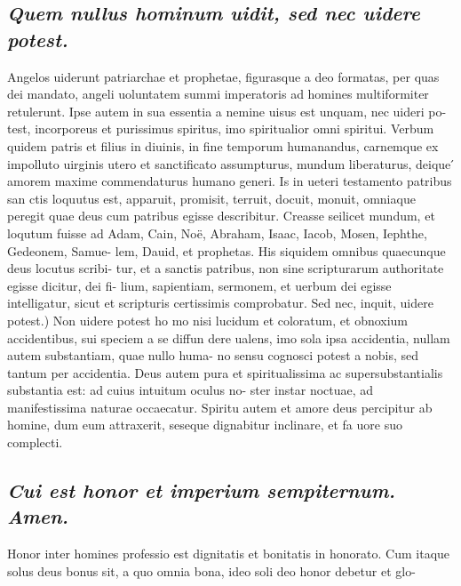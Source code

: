 \documentclass{article}
\begin{document}
\begin{pages}
\subsection*{\textit{Quem nullus hominum uidit, sed nec uidere potest. }}\pstart Angelos uiderunt patriarchae et prophetae, figurasque a deo formatas, per quas dei mandato, angeli uoluntatem summi imperatoris ad homines multiformiter retulerunt. Ipse autem in sua essentia a nemine uisus est unquam, nec uideri po- test, incorporeus et purissimus spiritus, imo spiritualior omni spiritui. Verbum quidem patris et filius in diuinis, in fine temporum humanandus, carnemque ex impolluto uirginis utero et sanctificato assumpturus, mundum liberaturus, deique ́ amorem maxime commendaturus humano generi. Is in ueteri testamento patribus san ctis loquutus est, apparuit, promisit, terruit, docuit, monuit, omniaque peregit quae deus cum patribus egisse describitur. Creasse seilicet mundum, et loqutum fuisse ad Adam, Cain, Noë, Abraham, Isaac, Iacob, Mosen, Iephthe, Gedeonem, Samue- lem, Dauid, et prophetas. His siquidem omnibus quaecunque deus locutus scribi- tur, et a sanctis patribus, non sine scripturarum authoritate egisse dicitur, dei fi- lium, sapientiam, sermonem, et uerbum dei egisse intelligatur, sicut et scripturis certissimis comprobatur. Sed nec, inquit, uidere potest.) Non uidere potest ho mo nisi lucidum et coloratum, et obnoxium accidentibus, sui speciem a se diffun dere ualens, imo sola ipsa accidentia, nullam autem substantiam, quae nullo huma- no sensu cognosci potest a nobis, sed tantum per accidentia. Deus autem pura et spiritualissima ac supersubstantialis substantia est: ad cuius intuitum oculus no- ster instar noctuae, ad manifestissima naturae occaecatur. Spiritu autem et amore deus percipitur ab homine, dum eum attraxerit, seseque dignabitur inclinare, et fa uore suo complecti.  \pend
{}
{}
\subsection*{\textit{Cui est honor et imperium sempiternum. Amen. }}\pstart Honor inter homines professio est dignitatis et bonitatis in honorato. Cum itaque solus deus bonus sit, a quo omnia bona, ideo soli deo honor debetur et glo-  \pend

\end{pages}
\end{document}

